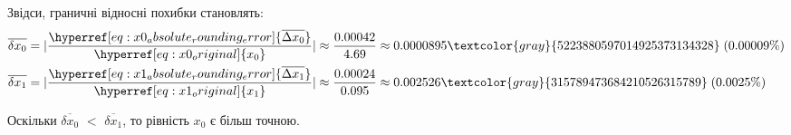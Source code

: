 Звідси, граничні відносні похибки становлять:
\begin{align}
    \overline{\delta x_0} & =
    |\frac{\hyperref[eq:x0_absolute_rounding_error]{\overline{\Delta x_0}}}{\hyperref[eq:x0_original]{x_0}}|
    \approx \frac{0.00042}{4.69}
    \approx 0.0000895\textcolor{gray}{5223880597014925373134328} \; (0.00009\%)
    \label{eq:x0_relative_rounding_error} \\
    \overline{\delta x_1} & =
    |\frac{\hyperref[eq:x1_absolute_rounding_error]{\overline{\Delta x_1}}}{\hyperref[eq:x1_original]{x_1}}|
    \approx \frac{0.00024}{0.095}
    \approx 0.002526\textcolor{gray}{315789473684210526315789} \; (0.0025\%)
    \label{eq:x1_relative_rounding_error}
\end{align}

Оскільки
\hyperref[eq:x0_relative_rounding_error]{$\overline{\delta x_0}$} $<$
\hyperref[eq:x1_relative_rounding_error]{$\overline{\delta x_1}$}, то рівність
\hyperref[eq:x0_original]{$x_0$} є більш точною.
